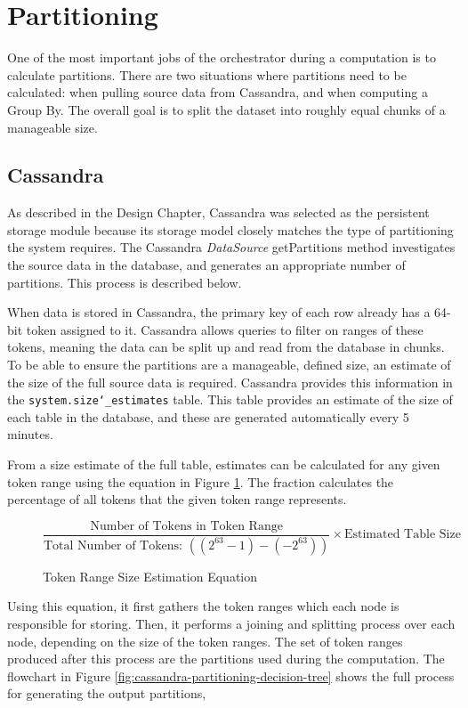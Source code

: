 \section{Partitioning}
One of the most important jobs of the orchestrator during a computation is to calculate partitions. There are two situations where partitions need to be calculated: when pulling source data from Cassandra, and when computing a Group By. The overall goal is to split the dataset into roughly equal chunks of a manageable size. 

\subsection{Cassandra}
As described in the Design Chapter, Cassandra was selected as the persistent storage module because its storage model closely matches the type of partitioning the system requires. The Cassandra \textit{DataSource} getPartitions method investigates the source data in the database, and generates an appropriate number of partitions. This process is described below.

When data is stored in Cassandra, the primary key of each row already has a 64-bit token assigned to it. Cassandra allows queries to filter on ranges of these tokens, meaning the data can be split up and read from the database in chunks. To be able to ensure the partitions are a manageable, defined size, an estimate of the size of the full source data is required. Cassandra provides this information in the \texttt{system.size\char`_estimates} table. This table provides an estimate of the size of each table in the database, and these are generated automatically every 5 minutes.

From a size estimate of the full table, estimates can be calculated for any given token range using the equation in Figure \ref{fig:token-range-estimation}. The fraction calculates the percentage of all tokens that the given token range represents.

\begin{figure}[h]
	\centering
	\[ \frac{\text{Number of Tokens in Token Range}}{\text{Total Number of Tokens: } ((2^{63}-1) - (-2^{63}))} \times \text{Estimated Table Size} \]
	\caption{Token Range Size Estimation Equation}
	\label{fig:token-range-estimation}
\end{figure}

Using this equation, it first gathers the token ranges which each node is responsible for storing. Then, it performs a joining and splitting process over each node, depending on the size of the token ranges. The set of token ranges produced after this process are the partitions used during the computation. The flowchart in Figure \ref{fig:cassandra-partitioning-decision-tree} shows the full process for generating the output partitions, 

